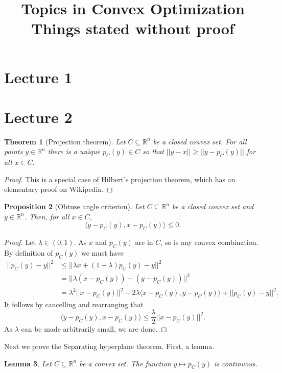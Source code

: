 \documentclass{report}
\theoremstyle{definition}
\theoremstyle{plain}
\newtheorem{thm}{Theorem}[section]
\newtheorem{prop}[thm]{Proposition}
\newtheorem{lem}[thm]{Lemma}
\theoremstyle{definition}
\begin{document}
	\title{Topics in Convex Optimization\\ Things stated without proof}
	\section{Lecture 1}
	\section{Lecture 2}	
	\begin{thm}[Projection theorem]
		Let $C\subseteq \mathbb{R}^n$ be a closed convex set. For all points $y\in\mathbb{R}^n$ there is a unique $p_C(y)\in C$ so that $||y - x|| \geq ||y - p_C(y)||$ for all $x\in C$.
 	\end{thm}
 	\begin{proof}
 		This is a special case of Hilbert's projection theorem, which has an elementary proof on Wikipedia.
 	\end{proof}
	\begin{prop}[Obtuse angle criterion]
		Let $C\subseteq \mathbb{R}^n$ be a closed convex set and $y\in \mathbb{R}^n$. Then, for all $x\in C$,
		\[
			\langle y - p_C(y), x- p_C(y)\rangle \leq 0.
		\] 
	\end{prop}
	\begin{proof}
		Let $\lambda \in (0,1)$. As $x$ and $p_C(y)$ are in $C$, so is any convex combination. By definition of $p_C(y)$ we must have
		\begin{align*}
			||p_C(y) - y||^2 &\leq ||\lambda x + (1-\lambda)p_C(y) - y||^2\\
			&= ||\lambda (x - p_C(y)) -(y-p_C(y))||^2\\
			&= \lambda^2||x-p_C(y)||^2 -2\lambda \langle x - p_C(y), y-p_C(y)\rangle + ||p_C(y) - y||^2.
		\end{align*}
		It follows by cancelling and rearranging that 
		\[
			\langle y - p_C(y), x- p_C(y)\rangle  \leq \frac{\lambda}{2}||x-p_C(y)||^2.
		\]
		As $\lambda$ can be made arbitrarily small, we are done.
	\end{proof}
	Next we prove the Separating hyperplane theorem. First, a lemma.
	\begin{lem}
		Let $C\subseteq \mathbb{R}^n$ be a convex set. The function $y\mapsto p_C(y)$ is continuous.
	\end{lem}
\end{document}
